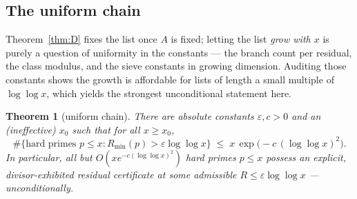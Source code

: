\documentclass[11pt]{article}
\theoremstyle{plain}
\newtheorem{theorem}{Theorem}[section]
\theoremstyle{remark}
\theoremstyle{plain}
\numberwithin{equation}{section}
\begin{document}
\subsection{The uniform chain}\label{sec:uniform}

Theorem~\ref{thm:D} fixes the list once $A$ is fixed; letting the list
\emph{grow with $x$} is purely a question of uniformity in the
constants --- the branch count per residual, the class modulus, and
the sieve constants in growing dimension. Auditing those constants
shows the growth is affordable for lists of length a small multiple of
$\log\log x$, which yields the strongest unconditional statement here.

\begin{theorem}[uniform chain]\label{thm:U}
There are absolute constants $\varepsilon, c > 0$ and an
(ineffective) $x_0$ such that for all $x \ge x_0$,
\[
  \#\bigl\{\text{hard primes } p \le x :
  R_{\min}(p) > \varepsilon \log\log x\bigr\}
  \;\le\; x\,\exp\!\bigl(-c\,(\log\log x)^2\bigr).
\]
In particular, all but $O(x e^{-c(\log\log x)^2})$ hard primes
$p \le x$ possess an explicit, divisor-exhibited residual certificate
at some admissible $R \le \varepsilon\log\log x$ ---
unconditionally.
\end{theorem}
\end{document}
